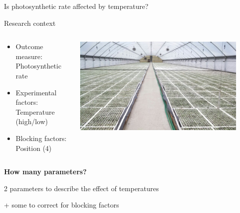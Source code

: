 \documentclass[10pt]{beamer}
\begin{document}
\begin{frame}{Is photosynthetic rate affected by temperature?}

 \begin{block}{Research context}
 \begin{columns}
  \begin{column}{0.8\textwidth}
   \begin{itemize}
    \item Outcome measure: Photosynthetic rate
    \item Experimental factors: Temperature (high/low)
    \item Blocking factors: Position (4)
   \end{itemize}
  \end{column}
  \begin{column}{0.2\textwidth}
    \includegraphics[width=0.9\textwidth]{Figures/photos}
  \end{column}

 \end{columns}
 \end{block}
 
 \textbf{How many parameters?}
 
\pause

2 parameters to describe the effect of temperatures \\

\pause

+ some to correct for blocking factors
 
\end{frame}
\end{document}
